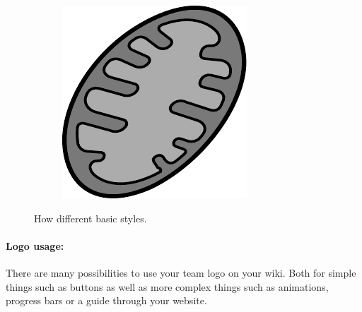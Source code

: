 \begin{figure}[h]
\begin{subfigure}[t]{0.2\linewidth}
    \end{subfigure}
    \begin{subfigure}[t]{0.2\linewidth}
        \includegraphics[width=\textwidth]{chapters/images/mitochondria-greyscale}
    \end{subfigure}
    \caption{How different basic styles.}
    \label{fig:basic-styles}
\end{figure}
\paragraph{Logo usage:} There are many possibilities to use your team logo on your wiki.
Both for simple things such as buttons as well as more complex things such as animations, progress bars or a guide through your website.

